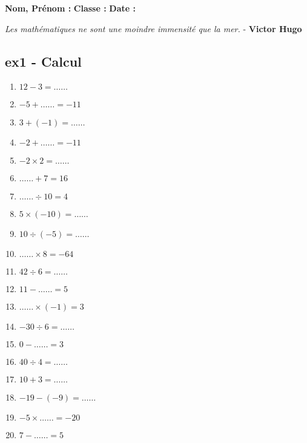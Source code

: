 \documentclass[11pt]{article}
\begin{document}
\newcommand{\Pointilles}[1][3]{%
  \multido{}{#1}{\makebox[\linewidth]{\dotfill}\\[\parskip]
}}

\setlength{\columnseprule}{1pt}

\textbf{Nom, Prénom :} \hspace{8cm} \textbf{Classe :} \hspace{3cm} \textbf{Date :}\\

\begin{center}
  \textit{Les mathématiques ne sont une moindre immensité que la mer.}  - \textbf{Victor Hugo}
\end{center}


\subsection*{ex1 - Calcul}

\begin{multicols}{3}\noindent

  \begin{enumerate}
  \item $12 - 3 = \ldots\ldots$
  \item $-5 + \ldots\ldots = -11$
  \item $3 + \left( -1\right) = \ldots\ldots$
  \item $-2 + \ldots\ldots = -11$
  \item $-2 \times 2 = \ldots\ldots$
  \item $\ldots\ldots + 7 = 16$
  \item $\ldots\ldots \div 10 = 4$
  \item $5 \times \left( -10\right) = \ldots\ldots$
  \item $10 \div \left( -5\right) = \ldots\ldots$
  \item $\ldots\ldots \times 8 = -64$
  \item $42 \div 6 = \ldots\ldots$
  \item $11 - \ldots\ldots = 5$
  \item $\ldots\ldots \times \left( -1\right) = 3$
  \item $-30 \div 6 = \ldots\ldots$
  \item $0 - \ldots\ldots = 3$
  \item $40 \div 4 = \ldots\ldots$
  \item $10 + 3 = \ldots\ldots$
  \item $-19 - \left( -9\right) = \ldots\ldots$
  \item $-5 \times \ldots\ldots = -20$
  \item $7 - \ldots\ldots = 5$
  \end{enumerate}
  
  \end{multicols}
\end{document}
